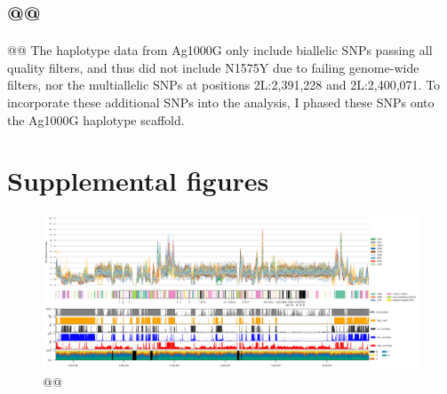 \documentclass[a4paper,11pt,abstracton,hidelinks]{scrartcl}
\begin{document}
\subsection{@@}\label{subsec:methods-@@}


@@
The haplotype data from Ag1000G only include biallelic SNPs passing all quality filters, and thus did not include N1575Y due to failing genome-wide filters, nor the multiallelic SNPs at positions 2L:2,391,228 and 2L:2,400,071. To incorporate these additional SNPs into the analysis, I phased these SNPs onto the Ag1000G haplotype scaffold.


\printbibliography


\clearpage
\beginsupplement
\section{Supplemental figures}\label{sec:supplemental-figures}


\clearpage
\begin{landscape}

\begin{figure}
\centering
\includegraphics[width=1.1\linewidth,center]{artwork/chapter6/accessibility.png}
\caption{@@
}
\label{fig:accessibility}
\end{figure}

\end{landscape}
\end{document}
